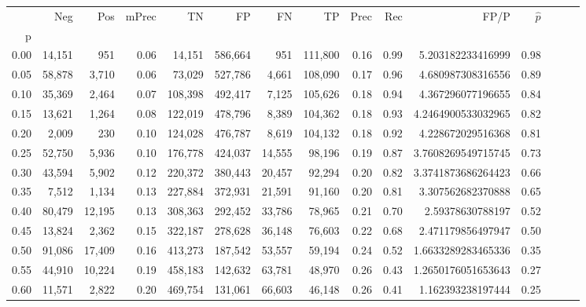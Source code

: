 \begin{tabular}{rrrrrrrrrrrrrrr}
\toprule
{} &     Neg &     Pos & mPrec &       TN &       FP &       FN &       TP &  Prec &   Rec &                 FP/P & $\hat{p}$ \\
p    &         &         &       &          &          &          &          &       &       &                      &           \\
\midrule
0.00 &  14,151 &     951 &  0.06 &   14,151 &  586,664 &      951 &  111,800 &  0.16 &  0.99 &    5.203182233416999 &      0.98 \\
0.05 &  58,878 &   3,710 &  0.06 &   73,029 &  527,786 &    4,661 &  108,090 &  0.17 &  0.96 &    4.680987308316556 &      0.89 \\
0.10 &  35,369 &   2,464 &  0.07 &  108,398 &  492,417 &    7,125 &  105,626 &  0.18 &  0.94 &    4.367296077196655 &      0.84 \\
0.15 &  13,621 &   1,264 &  0.08 &  122,019 &  478,796 &    8,389 &  104,362 &  0.18 &  0.93 &   4.2464900533032965 &      0.82 \\
0.20 &   2,009 &     230 &  0.10 &  124,028 &  476,787 &    8,619 &  104,132 &  0.18 &  0.92 &    4.228672029516368 &      0.81 \\
0.25 &  52,750 &   5,936 &  0.10 &  176,778 &  424,037 &   14,555 &   98,196 &  0.19 &  0.87 &   3.7608269549715745 &      0.73 \\
0.30 &  43,594 &   5,902 &  0.12 &  220,372 &  380,443 &   20,457 &   92,294 &  0.20 &  0.82 &   3.3741873686264423 &      0.66 \\
0.35 &   7,512 &   1,134 &  0.13 &  227,884 &  372,931 &   21,591 &   91,160 &  0.20 &  0.81 &    3.307562682370888 &      0.65 \\
0.40 &  80,479 &  12,195 &  0.13 &  308,363 &  292,452 &   33,786 &   78,965 &  0.21 &  0.70 &     2.59378630788197 &      0.52 \\
0.45 &  13,824 &   2,362 &  0.15 &  322,187 &  278,628 &   36,148 &   76,603 &  0.22 &  0.68 &    2.471179856497947 &      0.50 \\
0.50 &  91,086 &  17,409 &  0.16 &  413,273 &  187,542 &   53,557 &   59,194 &  0.24 &  0.52 &   1.6633289283465336 &      0.35 \\
0.55 &  44,910 &  10,224 &  0.19 &  458,183 &  142,632 &   63,781 &   48,970 &  0.26 &  0.43 &   1.2650176051653643 &      0.27 \\
0.60 &  11,571 &   2,822 &  0.20 &  469,754 &  131,061 &   66,603 &   46,148 &  0.26 &  0.41 &    1.162393238197444 &      0.25 \\

\end{tabular}
